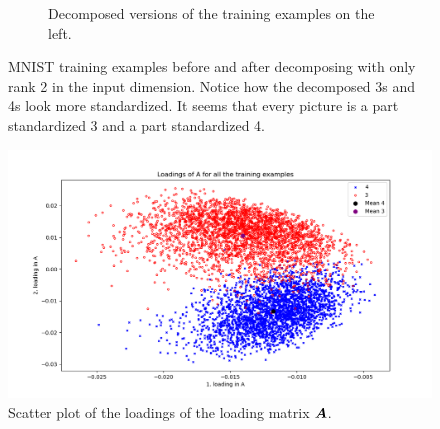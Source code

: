 \begin{figure}
\begin{subfigure}{0.45\linewidth}
        \captionsetup{width=.8\linewidth}
        \caption{Decomposed versions of the training examples on the left.}
    \end{subfigure}
    \captionsetup{width=.95\linewidth}
    \caption{MNIST training examples before and after decomposing with only rank 2 in the input dimension. Notice how the decomposed 3s and 4s look more standardized. It seems that every picture is a part standardized 3 and a part standardized 4. }
    \label{fig:decompExample3_4}
\end{figure}

\begin{figure}
    \centering
    \includegraphics[width=\linewidth]{Pics/05_methodology/LoadingsOfAScatterMNIST.png}
    \caption{Scatter plot of the loadings of the loading matrix $\boldsymbol{A}$.}
    \label{fig:my_label}
\end{figure}
